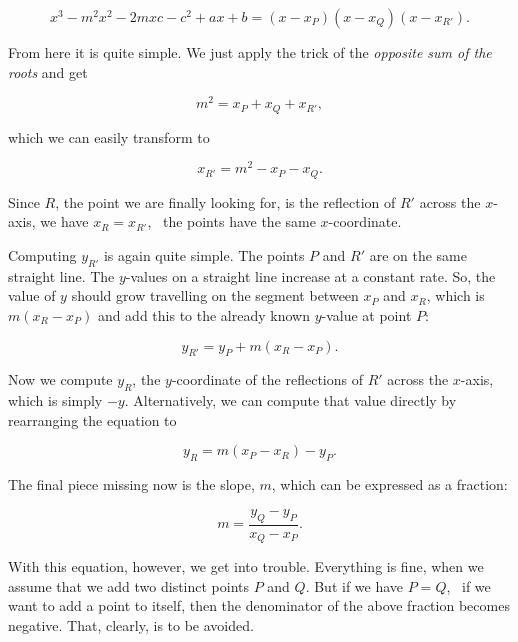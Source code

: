 \documentclass[tikz]{scrreprt}
\begin{document}
\begin{equation}  
x^3 - m^2x^2 - 2mxc - c^2 + ax + b = (x-x_P)(x-x_Q)(x-x_{R'}).
\end{equation}

From here it is quite simple. 
We just apply the trick of the 
\emph{opposite sum of the roots}
and get

\begin{equation}  
m^2 = x_P + x_Q + x_{R'},
\end{equation}

which we can easily transform to 

\begin{equation}  
x_{R'} = m^2 - x_P - x_Q. 
\end{equation}

Since $R$, the point we are finally looking for,
is the reflection of $R'$ across the $x$-axis,
we have $x_{R} = x_{R'}$, \ie\ the points have
the same $x$-coordinate.

Computing $y_{R'}$ is again quite simple.
The points $P$ and $R'$ are on the same 
straight line. The $y$-values on a straight line
increase at a constant rate. So, 
the value of $y$ should grow travelling on the segment
between $x_P$ and $x_R$, which is
$m(x_R - x_P)$ and add this to the 
already known $y$-value at point $P$:

\begin{equation}
y_{R'} = y_P + m(x_R - x_P).
\end{equation}

Now we compute $y_R$, the $y$-coordinate
of the reflections of $R'$ across the $x$-axis,
which is simply $-y$. 
Alternatively, we can compute that 
value directly by rearranging the 
equation to

\begin{equation}
y_R = m(x_P - x_R)-y_P.
\end{equation}

The final piece missing now is the slope, $m$,
which can  be expressed as a fraction:

\begin{equation}
m = \frac{y_Q - y_P}{x_Q - x_P}.
\end{equation}

With this equation, however,
we get into trouble. Everything is fine,
when we assume that we add two distinct
points $P$ and $Q$. But if we have
$P = Q$, \ie\ if we want to add a point
to itself, then the denominator of
the above fraction becomes negative.
That, clearly, is to be avoided.
\end{document}
